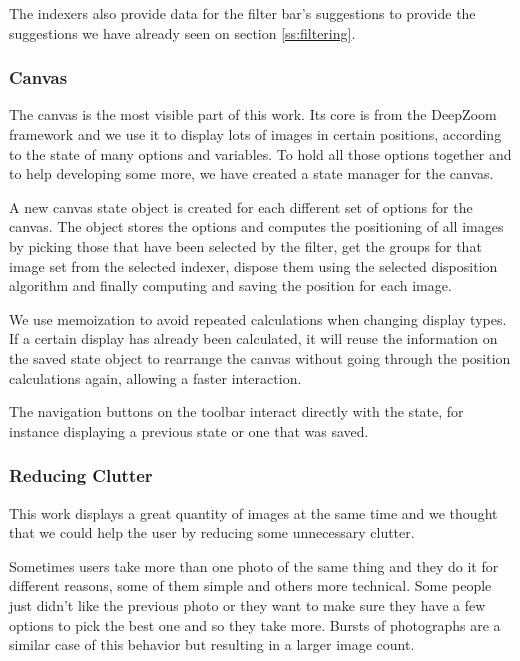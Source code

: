 The indexers also provide data for the filter bar's suggestions to provide the suggestions we have already seen on section \ref{ss:filtering}.

\vspace{-5px}
\subsubsection{Canvas}

The canvas is the most visible part of this work. Its core is from the DeepZoom framework and we use it to display lots of images in certain positions, according to the state of many options and variables. To hold all those options together and to help developing some more, we have created a state manager for the canvas.

A new canvas state object is created for each different set of options for the canvas. The object stores the options and computes the positioning of all images by picking those that have been selected by the filter, get the groups for that image set from the selected indexer, dispose them using the selected disposition algorithm and finally computing and saving the position for each image.

We use memoization to avoid repeated calculations when changing display types. If a certain display has already been calculated, it will reuse the information on the saved state object to rearrange the canvas without going through the position calculations again, allowing a faster interaction.

The navigation buttons on the toolbar interact directly with the state, for instance displaying a previous state or one that was saved.


\vspace{-5px}
\subsubsection{Reducing Clutter}
\label{ss:stacks}

This work displays a great quantity of images at the same time and we thought that we could help the user by reducing some unnecessary clutter.

Sometimes users take more than one photo of the same thing and they do it for different reasons, some of them simple and others more technical. Some people just didn't like the previous photo or they want to make sure they have a few options to pick the best one and so they take more. Bursts of photographs are a similar case of this behavior but resulting in a larger image count.

